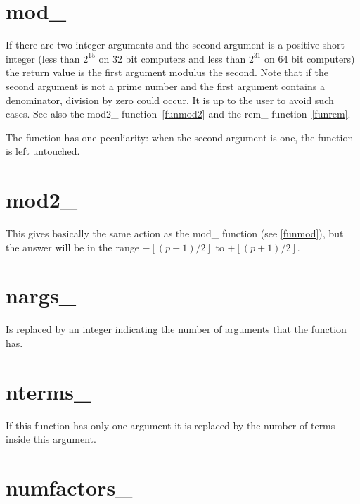 \section{mod\_}
\label{funmod}
\noindent If there are two integer arguments and the second 
argument is a positive short integer (less than $2^{15}$ on 32 bit 
computers and less than $2^{31}$ on 64 bit computers) the return value is 
the first argument modulus the second. Note that if the second argument is 
not a prime number and the first argument contains a denominator, division 
by zero could occur. It is up to the user to avoid such cases. See also the 
mod2\_ function~\ref{funmod2} and the rem\_ function~\ref{funrem}.

The function has one peculiarity: when the second argument is one, the 
function is left untouched.


\section{mod2\_}
\label{funmod2}
\noindent This gives basically the same action as the mod\_ function (see 
\ref{funmod}), but the answer will be in the range $-[(p-1)/2]$ to 
$+[(p+1)/2]$.


\section{nargs\_}
\label{funnargs}
\noindent Is replaced by an integer indicating the number of 
arguments that the function has.


\section{nterms\_}
\label{funnterms}
\noindent If this function has only one argument it is replaced by 
the number of terms inside this argument.


\section{numfactors\_}
\label{funnumfactors}

